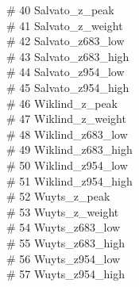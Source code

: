     \# 40 Salvato\_z\_peak \\
    \# 41 Salvato\_z\_weight \\
    \# 42 Salvato\_z683\_low \\
    \# 43 Salvato\_z683\_high \\
    \# 44 Salvato\_z954\_low \\
    \# 45 Salvato\_z954\_high \\
    \# 46 Wiklind\_z\_peak \\
    \# 47 Wiklind\_z\_weight \\
    \# 48 Wiklind\_z683\_low \\
    \# 49 Wiklind\_z683\_high \\
    \# 50 Wiklind\_z954\_low \\
    \# 51 Wiklind\_z954\_high \\
    \# 52 Wuyts\_z\_peak \\
    \# 53 Wuyts\_z\_weight \\
    \# 54 Wuyts\_z683\_low \\
    \# 55 Wuyts\_z683\_high \\
    \# 56 Wuyts\_z954\_low \\
    \# 57 Wuyts\_z954\_high



